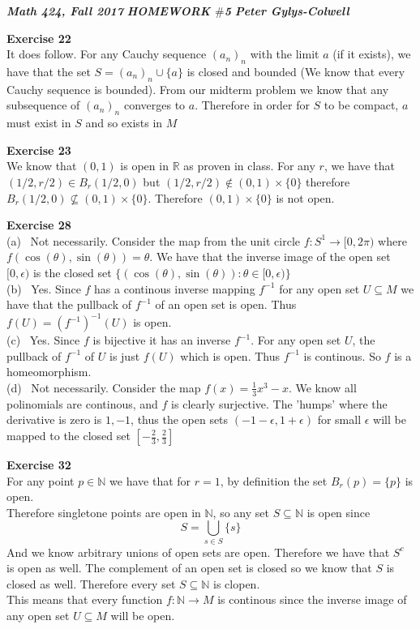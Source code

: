\documentclass[12pt]{article}
\newenvironment{ques}[1]{\textbf{Exercise #1}\vspace{1 mm}\\ }{\bigskip}
\theoremstyle{definition}
\newcommand{\R}{\mathbb R}
\newcommand{\N}{\mathbb N}
\newcommand{\s}{\sin}
\renewcommand{\c}{\cos}
\renewcommand{\t}{\theta}
\begin{document}
\noindent \textit{\textbf{Math 424, Fall 2017}} \hspace{1.3cm}
\textit{\textbf{HOMEWORK $\#$5}} \hspace{1.3cm} \textit{\textbf{Peter
Gylys-Colwell}} 

\vspace{1cm}

\begin{ques}{22}
	It does follow. For any Cauchy sequence $(a_n)_n$ with the limit $a$ (if it
	exists), we have that the set $S = (a_n)_n \cup \{a\}$ is closed and
	bounded (We know that every Cauchy sequence is bounded). From our midterm
	problem we know that any subsequence of $(a_n)_n$ converges to $a$.
	Therefore in order for $S$ to be compact, $a$ must exist in $S$ and so
	exists in $M$
\end{ques}

\begin{ques}{23}
	We know that $(0,1)$ is open in $\R$ as proven in class. For any $r$, we
	have that $(1/2,r/2) \in B_r(1/2,0)$ but $(1/2,r/2) \notin (0,1) \times \{0\}$
	therefore $B_r(1/2,0) \not \subseteq (0,1) \times \{0\}$. Therefore $(0,1)
	\times \{0\}$ is not open. 
\end{ques}


\begin{ques}{28}
	(a) \ Not necessarily. Consider the map from the unit circle $f : S^1 \to
	[0, 2\pi)$ where $f(\c(\t), \s(\t)) = \t$. We have that the inverse image
	of the open set $[0,\epsilon)$ is the closed set $\{(\c(\t),\s(\t)): \t \in
	[0, \epsilon)\}$\\
	(b) \ Yes. Since $f$ has a continous inverse mapping $f^{-1}$ for any open
	set $U \subseteq M$ we have that the pullback of $f^{-1}$ of an open set is
	open. Thus $f(U) = (f^{-1})^{-1}(U)$ is open.\\
	(c) \ Yes. Since $f$ is bijective it has an inverse $f^{-1}$. For any open
	set $U$, the pullback of $f^{-1}$ of $U$ is just $f(U)$ which is open. Thus
	$f^{-1}$ is continous. So $f$ is a homeomorphism. \\
	(d) \ Not necessarily. Consider the map $f(x) = \frac 1 3 x^3 - x$. We know all
	polinomials are continous, and $f$ is clearly surjective. The 'humps' where
	the derivative is zero is $1, -1$, thus the open sets $(-1 -\epsilon, 1 +
	\epsilon)$ for small $\epsilon$ will be mapped to the closed set $[-\frac 2
	3, \frac 2 3]$
\end{ques}

\begin{ques}{32}
	For any point $p \in \N$ we have that for $r = 1$, by definition the set
	$B_r(p) = \{p\}$ is open.\\
	Therefore singletone points are open in $\N$, so any set $S \subseteq \N$
	is open since
	$$S = \bigcup_{s \in S} \{s\}$$
	And we know arbitrary unions of open sets are open. Therefore we have that
	$S^{c}$ is open as well. The complement of an open set is closed so we know
	that $S$ is closed as well. Therefore every set $S \subseteq \N$ is clopen.\\
	This means that every function $f: \N \to M$ is continous since the inverse
	image of any open set $U \subseteq M$ will be open.
\end{ques}
\end{document}
